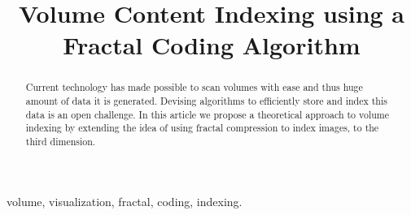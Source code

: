 \documentclass[10pt, conference, compsocconf]{IEEEtran}
\begin{document}
%
\title{Volume Content Indexing using a Fractal Coding Algorithm}



\author{
}








\maketitle


\begin{abstract}
Current technology has made possible to scan volumes with ease and thus huge amount of data it is generated. Devising algorithms to efficiently store and index this data is an open challenge.
In this article we propose a theoretical approach to volume indexing by extending the idea of using fractal compression to index images, to the third dimension.
\end{abstract}

\begin{IEEEkeywords}
volume, visualization, fractal, coding, indexing.
\end{IEEEkeywords}~\\


%
\IEEEpeerreviewmaketitle
\end{document}

